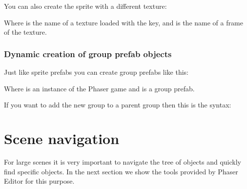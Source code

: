 \documentclass[letterpaper,10pt,english]{sphinxmanual}
\begin{document}
You can also create the sprite with a different texture:

\begin{sphinxVerbatim}[commandchars=\\\{\}]
        
\end{sphinxVerbatim}

Where  is the name of a texture loaded with the  key, and  is the name of a frame of the texture.


\subsubsection{Dynamic creation of group prefab objects}
\label{\detokenize{canvas:dynamic-creation-of-group-prefab-objects}}
Just like sprite prefabs you can create group prefabs like this:

\begin{sphinxVerbatim}[commandchars=\\\{\}]
    
\end{sphinxVerbatim}

Where  is an instance of the Phaser game and  is a group prefab.

If you want to add the new group to a parent group then this is the syntax:

\begin{sphinxVerbatim}[commandchars=\\\{\}]
     
\end{sphinxVerbatim}


\section{Scene navigation}
\label{\detokenize{canvas:scene-navigation}}
For large scenes it is very important to navigate the tree of objects and quickly find specific objects. In the next section we show the tools provided by Phaser Editor for this purpose.
\end{document}
